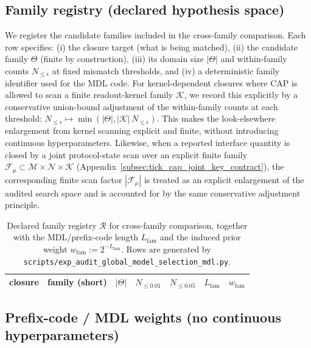 \subsection{Family registry (declared hypothesis space)}
\label{subsec:mdl_family_registry}

We register the candidate families included in the cross-family comparison.
Each row specifies:
(i) the closure target (what is being matched),
(ii) the candidate family $\Theta$ (finite by construction),
(iii) its domain size $|\Theta|$ and within-family counts $N_{\le\epsilon}$ at fixed mismatch thresholds,
and (iv) a deterministic family identifier used for the MDL code.
\AuditTag For kernel-dependent closures where CAP is allowed to scan a finite readout-kernel family $\mathcal{K}$, we record this explicitly by a conservative union-bound adjustment of the within-family counts at each threshold:
$N_{\le\epsilon}\mapsto \min(|\Theta|,|\mathcal{K}|\,N_{\le\epsilon})$.
This makes the look-elsewhere enlargement from kernel scanning explicit and finite, without introducing continuous hyperparameters.
\AuditTag Likewise, when a reported interface quantity is closed by a joint protocol-state scan over an explicit finite family $\mathcal{F}_\mu\subset\mathcal{M}\times\mathcal{N}\times\mathcal{K}$ (Appendix~\ref{subsec:tick_cap_joint_key_contract}), the corresponding finite scan factor $|\mathcal{F}_\mu|$ is treated as an explicit enlargement of the audited search space and is accounted for by the same conservative adjustment principle.

\begin{table}[t]
\centering
\scriptsize
\setlength{\tabcolsep}{6pt}
\renewcommand{\arraystretch}{1.15}
\begin{tabular}{llrrrrr}
\toprule
closure & family (short) & $|\Theta|$ & $N_{\le 0.01}$ & $N_{\le 0.05}$ & $L_{\mathrm{fam}}$ & $w_{\mathrm{fam}}$ \\
\midrule
%
\end{tabular}
\caption{Declared family registry $\mathcal{R}$ for cross-family comparison, together with the MDL/prefix-code length $L_{\mathrm{fam}}$ and the induced prior weight $w_{\mathrm{fam}}:=2^{-L_{\mathrm{fam}}}$. Rows are generated by \texttt{scripts/exp\_audit\_global\_model\_selection\_mdl.py}.}
\label{tab:audit_global_mdl_family_registry}
\end{table}

\subsection{Prefix-code / MDL weights (no continuous hyperparameters)}
\label{subsec:mdl_prefix_code}

